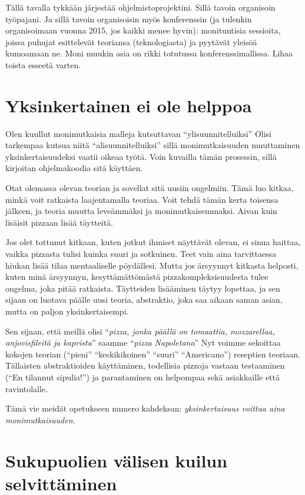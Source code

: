 Tällä tavalla tykkään järjestää ohjelmistoprojektini. Sillä tavoin organisoin työpajani. Ja sillä tavoin organisoisin myös konferenssin (ja tulenkin organisoimaan vuonna 2015, jos kaikki menee hyvin): monituntisia sessioita, joissa puhujat esittelevät teoriansa (teknologiasta) ja pyytävät yleisöä kumoamaan ne. Moni muukin asia on rikki totutussa konferenssimallissa. Lihaa toista esseetä varten.

\section{Yksinkertainen ei ole helppoa}

Olen kuullut monimutkaisia malleja kutsuttavan ``ylisuunnitelluiksi'' Olisi tarkempaa kutsua niitä ``alisuunnitelluiksi\vmq{,}'' sillä monimutkaisuuden muuttaminen yksinkertaisuudeksi vaatii oikeaa työtä. Voin kuvailla tämän prosessin, sillä kirjoitan ohjelmakoodia sitä käyttäen.

Otat olemassa olevan teorian ja sovellat sitä uusiin ongelmiin. Tämä luo kitkaa, minkä voit ratkaista laajentamalla teoriaa. Voit tehdä tämän kerta toisensa jälkeen, ja teoria muutta leveämmäksi ja monimutkaisemmaksi. Aivan kuin lisäisit pizzaan lisää täytteitä.

Jos olet tottunut kitkaan, kuten jotkut ihmiset näyttävät olevan, ei sinua haittaa, vaikka pizzasta tulisi kuinka suuri ja sotkuinen. Teet vain aina tarvittaessa hiukan lisää tilaa mentaaliselle pöydällesi. Mutta jos ärsyynnyt kitkasta helposti, kuten minä ärsyynnyn, kesyttämättömästä pizzakompleksisuudesta tulee ongelma, joka pitää ratkaista. Täytteiden lisääminen täytyy lopettaa, ja sen sijaan on luotava päälle uusi teoria, abstraktio, joka saa aikaan saman asian, mutta on paljon yksinkertaisempi.

Sen sijaan, että meillä olisi ``\emph{pizza, jonka päällä on tomaattia, mozzarellaa, anjovisfileitä ja kaprista}\vmq{,}'' saamme ``\emph{pizza Napoletana}'' Nyt voimme sekoittaa kokojen teorian (``pieni\vmq{,}''  ``keskikikoinen\vmq{,}'' ``suuri\vmq{,}'' ``Americano'') reseptien teoriaan. Tällaisten abstraktioiden käyttäminen, todellisia pizzoja vastaan testaaminen (``En tilannut sipulia!'') ja parantaminen on helpompaa sekä asiakkaille että ravintolalle.

Tämä vie meidät opetukseen numero kahdeksan: \emph{yksinkertaisuus voittaa aina monimutkaisuuden.}

\section{Sukupuolien välisen kuilun selvittäminen}

